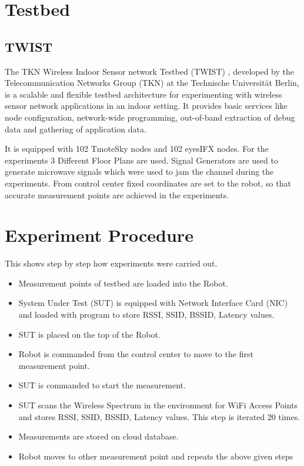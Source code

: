 \documentclass[11pt,a4paper,headinclude,footinclude,chapterprefix=on]{scrreprt}
\begin{document}
\section{Testbed} 
\subsection{TWIST} The TKN Wireless Indoor Sensor network Testbed (TWIST)  \cite{ref:twist}, developed by the Telecommunication Networks Group (TKN) at the Technische Universität Berlin, is a scalable and flexible testbed architecture for experimenting with wireless sensor network applications in an indoor setting. It provides basic services like node configuration, network-wide programming, out-of-band extraction of debug data and gathering of application data.

It is equipped with 102 TmoteSky nodes and 102 eyesIFX nodes. For the experiments 3 Different Floor Plans are used. Signal Generators are used to generate microwave signals which were used to jam the channel during the experiments. From control center fixed coordinates are set to the robot, so that accurate measurement points are achieved in the experiments. 

\section{Experiment Procedure} This shows step by step how experiments were carried out. 
\begin{itemize}
	\item Measurement points of testbed are loaded into the Robot. 
	\item System Under Test (SUT) is equipped with Network Interface Card (NIC) and loaded with program to store RSSI, SSID, BSSID, Latency values. 
	\item SUT is placed on the top of the Robot. 
	\item Robot is commanded from the control center to move to the first measurement point. 
	\item SUT is commanded to start the measurement. 
	\item SUT scans the Wireless Spectrum in the environment for WiFi Access Points and stores RSSI, SSID, BSSID, Latency values. This step is iterated 20 times. 
	\item Measurements are stored on cloud database. 
	\item Robot moves to other measurement point and repeats the above given steps 
\end{itemize}
\end{document}
